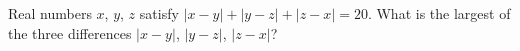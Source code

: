 Real numbers $x$, $y$, $z$ satisfy $|x-y|+|y-z|+|z-x|=20$. What is the largest of the three differences $|x-y|$, $|y-z|$, $|z-x|$?
